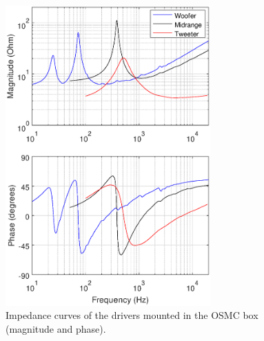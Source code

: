\documentclass[12pt,a4paper]{article}
\providecommand{\figlabel}[1]{\label{fig:#1}}
\begin{document}
\begin{figure}[tbp]
	\centering
	\includegraphics[width=0.7\textwidth]{impedance_curves_drivers.eps}
	\caption{Impedance curves of the drivers mounted in the OSMC box (magnitude and phase).}
	\figlabel{impedance_curves_drivers}
\end{figure}
\end{document}
